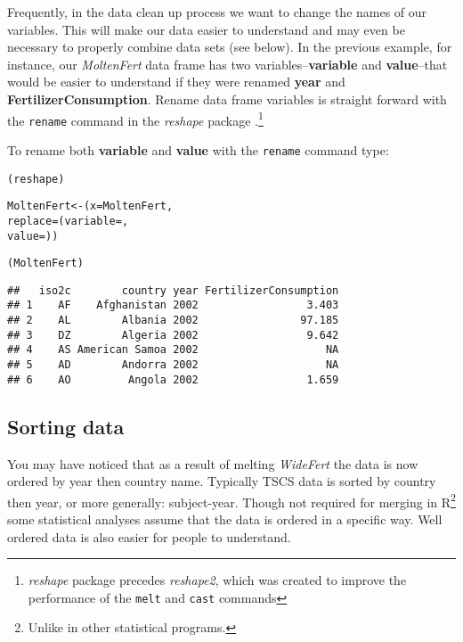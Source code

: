 Frequently, in the data clean up process we want to change the names of our variables. This will make our data easier to understand and may even be necessary to properly combine data sets (see below). In the previous example, for instance, our \emph{MoltenFert} data frame has two variables--\textbf{variable} and \textbf{value}--that would be easier to understand if they were renamed \textbf{year} and \textbf{FertilizerConsumption}. Rename data frame variables is straight forward with the \texttt{rename} command in the \emph{reshape} package \citep{R-reshape}.\footnote{\emph{reshape} package precedes \emph{reshape2}, which was created to improve the performance of the \texttt{melt} and \texttt{cast} commands}

To rename both \textbf{variable} and \textbf{value} with the \texttt{rename} command type:

\begin{knitrout}
\color{fgcolor}\begin{kframe}
\begin{alltt}
(reshape)

MoltenFert <- (x = MoltenFert,
                     replace = (variable = ,
                                 value = ))

(MoltenFert)
\end{alltt}
\begin{verbatim}
##   iso2c        country year FertilizerConsumption
## 1    AF    Afghanistan 2002                 3.403
## 2    AL        Albania 2002                97.185
## 3    DZ        Algeria 2002                 9.642
## 4    AS American Samoa 2002                    NA
## 5    AD        Andorra 2002                    NA
## 6    AO         Angola 2002                 1.659
\end{verbatim}
\end{kframe}
\end{knitrout}


\subsection{Sorting data}

You may have noticed that as a result of melting \emph{WideFert} the data is now ordered by year then country name. Typically TSCS data is sorted by country then year, or more generally: subject-year. Though not required for merging in R\footnote{Unlike in other statistical programs.} some statistical analyses assume that the data is ordered in a specific way. Well ordered data is also easier for people to understand.

